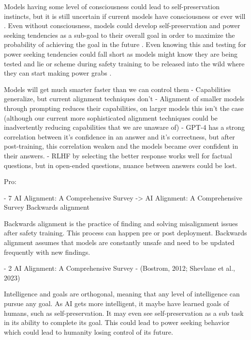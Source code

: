 Models having some level of consciousness could lead to self-preservation instincts, but it is still uncertain if current models have consciousness or ever will \citep{ward_towards_2025, butlin_consciousness_2023}. Even without consciousness, models could develop self-preservation and power seeking tendencies as a sub-goal to their overall goal in order to maximize the probability of achieving the goal in the future \citep{bostrom_superintelligent_2012}. Even knowing this and testing for power seeking tendencies could fall short as models might know they are being tested and lie or scheme during safety training to be released into the wild where they can start making power grabs \citep{carlsmith_scheming_2023}.


Models will get much smarter faster than we can control them
\citep{soares_central_2022} - Capabilities generalize, but current alignment techniques don't
\citep{askell_general_2021} - Alignment of smaller models through prompting reduces their capabilities, on larger models this isn't the case (although our current more sophisticated alignment techniques could be inadvertently reducing capabilities that we are unaware of)
\citep{openai_gpt_4_2023} - GPT-4 has a strong correlation between it's confidence in an answer and it's correctness, but after post-training, this correlation weaken and the models became over confident in their answers.
\citep{song_reward_2023} - RLHF by selecting the better response works well for factual questions, but in open-ended questions, nuance between answers could be lost.

Pro:

- 7 AI Alignment: A Comprehensive Survey -> AI Alignment: A Comprehensive Survey
Backwards alignment
\citep{ji_ai_2023}

Backwards alignment is the practice of finding and solving misalignment issues after safety training. This process can happen pre or post deployment. Backwards alignment assumes that models are constantly unsafe and need to be updated frequently with new findings.

- 2 AI Alignment: A Comprehensive Survey - (Bostrom, 2012; Shevlane et al., 2023)
\citep{bostrom_superintelligent_2012}

Intelligence and goals are orthogonal, meaning that any level of intelligence can pursue any goal. As AI gets more intelligent, it maybe have learned goals of humans, such as self-preservation. It may even see self-preservation as a sub task in its ability to complete its goal. This could lead to power seeking behavior which could lead to humanity losing control of its future.

